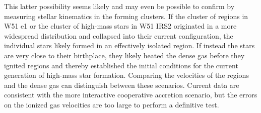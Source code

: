 \documentclass{emulateapj}
\begin{document}
This latter possibility seems likely and may even be possible to confirm by
measuring stellar kinematics in the forming clusters.  If the cluster of \hchii
regions in W51 e1 or the cluster of high-mass stars in W51 IRS2 originated in a
more widespread distribution and collapsed into their current configuration,
the individual stars likely formed in an effectively isolated region.  If
instead the stars are very close to their birthplace, they likely heated the
dense gas before they ignited \hii regions and thereby established the initial
conditions for the current generation of high-mass star formation.  Comparing
the velocities of the \hii regions and the dense gas can distinguish
between these scenarios.  Current data \citep[i.e., H77$\alpha$ measurements
in][]{Ginsburg2016a} are consistent
with the more interactive cooperative accretion scenario, but the errors on the
ionized gas velocities are too large to perform a definitive test.






\end{document}
